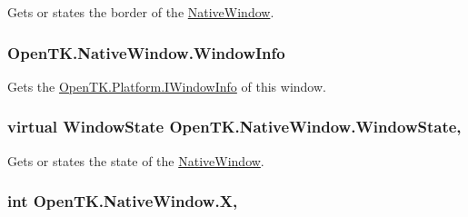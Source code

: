Gets or states the border of the \hyperlink{class_open_t_k_1_1_native_window}{Native\-Window}. 

\hypertarget{class_open_t_k_1_1_native_window_a1593f5f56e2bd9b67f9559385aba81de}{
\subsubsection[{Window\-Info}]{ Open\-T\-K.\-Native\-Window.\-Window\-Info\hspace{0.3cm}{\ttfamily [get]}}}\label{class_open_t_k_1_1_native_window_a1593f5f56e2bd9b67f9559385aba81de}


Gets the \hyperlink{interface_open_t_k_1_1_platform_1_1_i_window_info}{Open\-T\-K.\-Platform.\-I\-Window\-Info} of this window. 

\hypertarget{class_open_t_k_1_1_native_window_a78e6278aa092a82f672ff838ac7c1e2d}{
\subsubsection[{Window\-State}]{\setlength{\rightskip}{0pt plus 5cm}virtual {\bf Window\-State} Open\-T\-K.\-Native\-Window.\-Window\-State\hspace{0.3cm}{\ttfamily [get]}, {\ttfamily [set]}}}\label{class_open_t_k_1_1_native_window_a78e6278aa092a82f672ff838ac7c1e2d}


Gets or states the state of the \hyperlink{class_open_t_k_1_1_native_window}{Native\-Window}. 

\hypertarget{class_open_t_k_1_1_native_window_a7c5eafcedf58f9b72995633b93657463}{
\subsubsection[{X}]{\setlength{\rightskip}{0pt plus 5cm}int Open\-T\-K.\-Native\-Window.\-X\hspace{0.3cm}{\ttfamily [get]}, {\ttfamily [set]}}}\label{class_open_t_k_1_1_native_window_a7c5eafcedf58f9b72995633b93657463}


